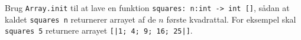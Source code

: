 Brug \lstinline{Array.init} til at lave en funktion \lstinline{squares: n:int -> int []}, sådan at kaldet \lstinline{squares n} returnerer arrayet af de $n$ første kvadrattal.  For eksempel skal \lstinline{squares 5} returnere arrayet \lstinline{[|1; 4; 9; 16; 25|]}.
